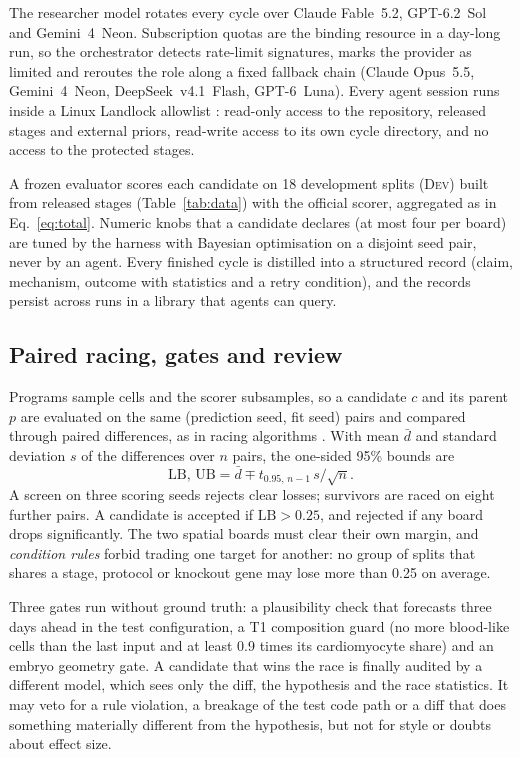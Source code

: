 \documentclass[9pt,twocolumn,a4paper]{extarticle}
\newcommand{\dev}{\textsc{Dev}}
\begin{document}
The researcher model rotates every cycle over Claude Fable~5.2, GPT-6.2~Sol and Gemini~4~Neon. Subscription quotas
are the binding resource in a day-long run, so the orchestrator detects rate-limit signatures, marks the provider as
limited and reroutes the role along a fixed fallback chain (Claude Opus~5.5, Gemini~4~Neon, DeepSeek~v4.1~Flash,
GPT-6~Luna). Every agent session runs inside a Linux Landlock allowlist \cite{salaun2017landlock}: read-only access
to the repository, released stages and external priors, read-write access to its own cycle directory, and no access
to the protected stages.

A frozen evaluator scores each candidate on 18 development splits (\dev) built from released stages (Table~\ref{tab:data}) with the official scorer, aggregated as in Eq.~\ref{eq:total}. Numeric knobs that a candidate declares (at most four per board) are tuned by the harness with Bayesian optimisation \cite{snoek2012practical} on a disjoint seed pair, never by an agent. Every finished cycle is distilled into a structured record (claim, mechanism, outcome with statistics and a retry condition), and the records persist across runs in a library that agents can query.

\subsection{Paired racing, gates and review}

Programs sample cells and the scorer subsamples, so a candidate $c$ and its parent $p$ are evaluated on the same
(prediction seed, fit seed) pairs and compared through paired differences, as in racing algorithms
\cite{birattari2002racing}. With mean $\bar d$ and standard deviation $s$ of the differences over $n$ pairs, the
one-sided 95\% bounds are
\begin{equation}
\mathrm{LB},\,\mathrm{UB} = \bar d \mp t_{0.95,\,n-1}\, s/\sqrt{n}. \label{eq:lb}
\end{equation}
A screen on three scoring seeds rejects clear losses; survivors are raced on eight further pairs. A candidate is
accepted if $\mathrm{LB}>0.25$, and rejected if any board drops significantly. The two spatial boards must clear
their own margin, and \emph{condition rules} forbid trading one target for another: no group of splits that shares a
stage, protocol or knockout gene may lose more than 0.25 on average.

Three gates run without ground truth: a plausibility check that forecasts three days ahead in the test configuration,
a T1 composition guard (no more blood-like cells than the last input and at least 0.9 times its cardiomyocyte share)
and an embryo geometry gate. A candidate that wins the race is finally audited by a different model, which sees only
the diff, the hypothesis and the race statistics. It may veto for a rule violation, a breakage of the test code path
or a diff that does something materially different from the hypothesis, but not for style or doubts about effect
size.
\end{document}
